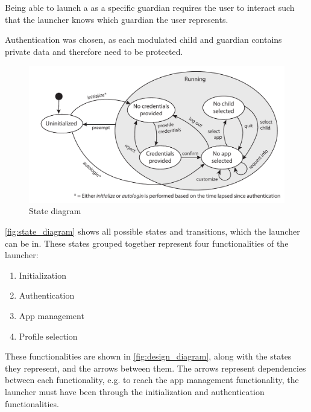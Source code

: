 Being able to launch a \girafapp[] as a specific guardian requires the user to interact such that the launcher knows which guardian the user represents.

Authentication was chosen, as each modulated child and guardian contains private data and therefore need to be protected.

\begin{figure}[h]
	\centering
	\includegraphics[width=1\textwidth]{gfx/statediagram.pdf}
	\caption{State diagram}
	\label{fig:state_diagram}
\end{figure}

\autoref{fig:state_diagram} shows all possible states and transitions, which the launcher can be in. 
These states grouped together represent four functionalities of the launcher:

\begin{enumerate}
	\item Initialization
	\item Authentication
	\item App management
	\item Profile selection
\end{enumerate}

These functionalities are shown in \autoref{fig:design_diagram}, along with the states they represent, and the arrows between them.
The arrows represent dependencies between each functionality, e.g. to reach the app management functionality, the launcher must have been through the initialization and authentication functionalities.

